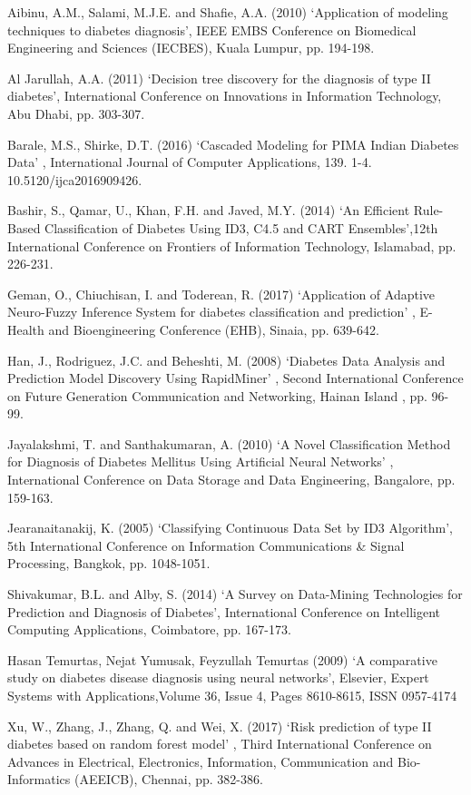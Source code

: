 \documentclass[a4paper, 14pt, oneside]{Thesis}
\begin{document}
% 
%
%
\begin{thebibliography}{99}
  
  
 Aibinu, A.M., Salami, M.J.E. and Shafie, A.A. (2010) `Application of modeling techniques to diabetes diagnosis', IEEE EMBS Conference on Biomedical Engineering and Sciences (IECBES), Kuala Lumpur, pp. 194-198.

 Al Jarullah, A.A. (2011) `Decision tree discovery for the diagnosis of type II diabetes', International Conference on Innovations in Information Technology, Abu Dhabi, pp. 303-307.

 Barale, M.S., Shirke, D.T. (2016) `Cascaded Modeling for PIMA Indian Diabetes Data' , International Journal of Computer Applications, 139. 1-4. 10.5120/ijca2016909426.

 Bashir, S., Qamar, U., Khan, F.H. and Javed, M.Y. (2014) `An Efficient Rule-Based Classification of Diabetes Using ID3, C4.5 and CART Ensembles',12th International Conference on Frontiers of Information Technology, Islamabad, pp. 226-231.

 Geman, O., Chiuchisan, I. and Toderean, R. (2017) `Application of Adaptive Neuro-Fuzzy Inference System for diabetes classification and prediction' , E-Health and Bioengineering Conference (EHB), Sinaia, pp. 639-642.

 Han, J., Rodriguez, J.C. and Beheshti, M. (2008) `Diabetes Data Analysis and Prediction Model Discovery Using RapidMiner' , Second International Conference on Future Generation Communication and Networking, Hainan Island , pp. 96-99.

 Jayalakshmi, T. and Santhakumaran, A. (2010) `A Novel Classification Method for Diagnosis of Diabetes Mellitus Using Artificial Neural Networks' , International Conference on Data Storage and Data Engineering, Bangalore, pp. 159-163.

 Jearanaitanakij, K. (2005) `Classifying Continuous Data Set by ID3 Algorithm', 5th International Conference on Information Communications \& Signal Processing, Bangkok, pp. 1048-1051.

 Shivakumar, B.L. and Alby, S. (2014) `A Survey on Data-Mining Technologies for Prediction and Diagnosis of Diabetes', International Conference on Intelligent Computing Applications, Coimbatore, pp. 167-173.

 Hasan Temurtas, Nejat Yumusak, Feyzullah Temurtas (2009) `A comparative study on diabetes disease diagnosis using neural networks', Elsevier, Expert Systems with Applications,Volume 36, Issue 4, Pages 8610-8615, ISSN 0957-4174

 Xu, W., Zhang, J., Zhang, Q. and Wei, X. (2017) `Risk prediction of type II diabetes based on random forest model' , Third International Conference on Advances in Electrical, Electronics, Information, Communication and Bio-Informatics (AEEICB), Chennai, pp. 382-386.



\end{thebibliography}
\end{document}
